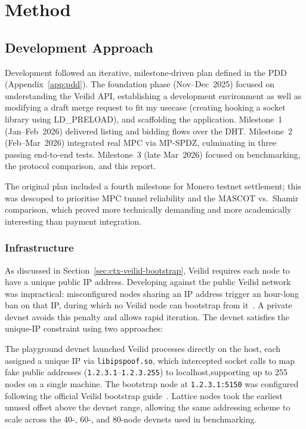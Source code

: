 
\section{Method}
\label{sec:method}

\subsection{Development Approach}
\label{sec:method-approach}

Development followed an iterative, milestone-driven plan defined in the PDD
(Appendix~\ref{app:pdd}).  The foundation phase (Nov--Dec~2025) focused on
understanding the Veilid API, establishing a development
environment as well as modifying a draft merge request \cite{veilid-devnet-mr444} to fit my usecase
(creating hooking a socket library using LD\_PRELOAD), and scaffolding the application.  Milestone~1 (Jan--Feb~2026)
delivered listing and bidding flows over the DHT.  Milestone~2 (Feb--Mar~2026)
integrated real MPC via MP-SPDZ, culminating in three passing end-to-end tests.
Milestone~3 (late Mar~2026) focused on benchmarking, the protocol comparison,
and this report.

The original plan included a fourth milestone for Monero testnet settlement;
this was descoped to prioritise MPC tunnel reliability and the MASCOT vs.\
Shamir comparison, which proved more technically demanding and more
academically interesting than payment integration.

\subsubsection{Infrastructure}

As discussed in Section~\ref{sec:ctx-veilid-bootstrap}, Veilid requires each
node to have a unique public IP address.  Developing against the public Veilid
network was impractical: misconfigured nodes sharing an IP address trigger an
hour-long ban on that IP, during which no Veilid node can bootstrap from
it~\cite{rioux2026_ip_punishment}.  A private devnet avoids this penalty and
allows rapid iteration.  The devnet satisfies the unique-IP constraint using
two approaches:

The playground devnet launched Veilid processes directly on the host, each
assigned a unique IP via \texttt{libipspoof.so}, which intercepted socket
calls to map fake public addresses (\texttt{1.2.3.1}--\texttt{1.2.3.255})
to localhost,supporting up to 255 nodes on a single machine.  The
bootstrap node at \texttt{1.2.3.1:5150} was configured following the
official Veilid bootstrap guide~\cite{veilid_bootstrap_setup}.  Lattice nodes took the earliest unused offset above the devnet range,
allowing the same addressing scheme to scale across the 40-, 60-, and
80-node devnets used in benchmarking.

